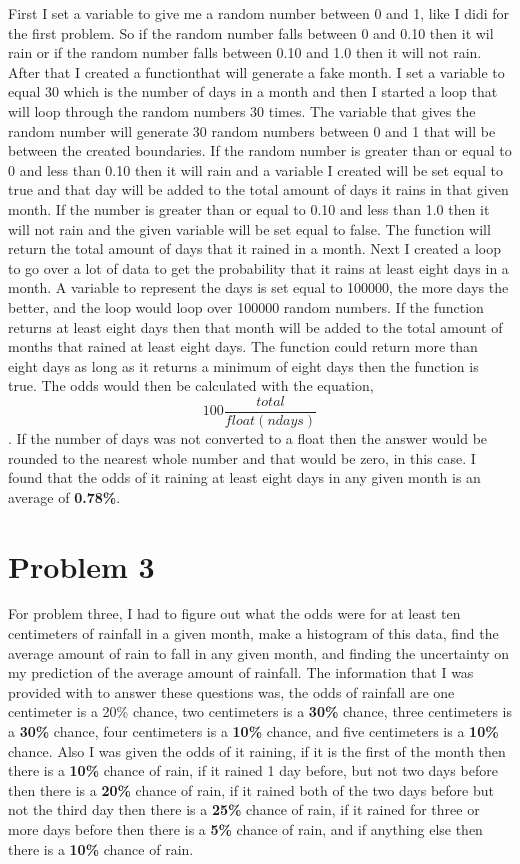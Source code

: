 \documentclass[twocolumn]{revtex4}
\begin{document}
First I set a variable to give me a random number between 0 and 1, like I didi for the first problem. So if the random number falls between 0 and 0.10 then it wil rain or if the random number falls between 0.10 and 1.0 then it will not rain. After that I created a functionthat will generate a fake month. I set a variable to equal 30 which is the number of days in a month and then I started a loop that will loop through the random numbers  30 times. The variable that gives the random number will generate 30 random numbers between 0 and 1 that will be between the created boundaries. If the random number is greater than or equal to  0 and less than 0.10 then it will rain and a variable I created will be set equal to true and that day will be added to the total amount of days it rains in that given month. If the number is greater than or equal to 0.10 and less than 1.0 then it will not rain and the given variable will be set equal to false. The function will return the total amount of days that it rained in a month. Next I created a loop to go over a lot of data to get the probability that it rains at least eight days in a month. A variable to represent the days is set equal to 100000, the more days the better, and the loop would loop over 100000 random numbers. If the function returns at least eight days then that month will be added to the total amount of months that rained at least eight days. The function could return more than eight days as long as it returns a minimum of eight days then the function is true. The odds would then be calculated with the equation, $$100\frac{total}{float(ndays)}$$. If the number of days was not converted to a float then the answer would be rounded to the nearest whole number and that would be zero, in this case. I found that the odds of it raining at least eight days in any given month is an average of {\bf 0.78\%}.

\section{\bf Problem 3}

For problem three, I had to figure out what the odds were for at least ten centimeters of rainfall in a given month, make a histogram of this data, find the average amount of rain to fall in any given month, and finding the uncertainty on my prediction of the average amount of rainfall. The information that I was provided with to answer these questions was, the odds of rainfall are one centimeter is a 20\% chance, two centimeters is a {\bf 30\%} chance, three centimeters is a {\bf 30\%} chance, four centimeters is a {\bf 10\%} chance, and five centimeters is a {\bf 10\%} chance. Also I was given the odds of it raining, if it is the first of the month then there is a {\bf 10\%} chance of rain, if it rained 1 day before, but not two days before then there is a {\bf 20\%} chance of rain, if it rained both of the two days before but not the third day then there is a {\bf 25\%} chance of rain, if it rained for three or more days before then there is a {\bf 5\%} chance of rain, and if anything else then there is a {\bf 10\%} chance of rain. 
\end{document}
